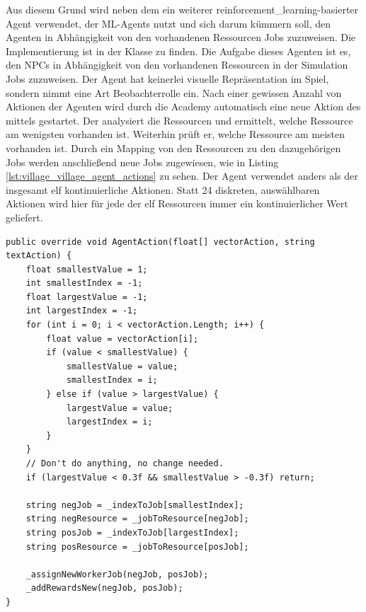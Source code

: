 Aus diesem Grund wird neben dem  ein weiterer \ac{reinforcement_learning}-basierter Agent verwendet, der ML-Agents nutzt und sich darum kümmern soll, den Agenten in Abhängigkeit von den vorhandenen Ressourcen Jobs zuzuweisen. Die Implementierung ist in der Klasse  zu finden. Die Aufgabe dieses Agenten ist es, den NPCs in Abhängigkeit von den vorhandenen Ressourcen in der Simulation Jobs zuzuweisen. Der Agent hat keinerlei visuelle Repräsentation im Spiel, sondern nimmt eine Art Beobachterrolle ein.
Nach einer gewissen Anzahl von Aktionen der Agenten wird durch die Academy automatisch eine neue Aktion des  mittels  gestartet. Der  analysiert die Ressourcen und ermittelt, welche Ressource am wenigsten vorhanden ist. Weiterhin prüft er, welche Ressource am meisten vorhanden ist. Durch ein Mapping von den Ressourcen zu den dazugehörigen Jobs werden anschließend neue Jobs zugewiesen, wie in Listing \ref{lst:village_village_agent_actions} zu sehen. Der Agent verwendet anders als der  insgesamt elf kontinuierliche Aktionen. Statt 24 diskreten, auswählbaren Aktionen wird hier für jede der elf Ressourcen immer ein kontinuierlicher Wert geliefert.

\begin{minipage}{\linewidth}
\begin{lstlisting}[linewidth=16.4cm, label=lst:village_village_agent_actions, caption=Aktionen des \inlinecode{VillageAgent}, xleftmargin=1cm]
public override void AgentAction(float[] vectorAction, string textAction) {
    float smallestValue = 1;
    int smallestIndex = -1;
    float largestValue = -1;
    int largestIndex = -1;
    for (int i = 0; i < vectorAction.Length; i++) {
        float value = vectorAction[i];
        if (value < smallestValue) {
            smallestValue = value;
            smallestIndex = i;
        } else if (value > largestValue) {
            largestValue = value;
            largestIndex = i;
        }
    }
    // Don't do anything, no change needed.
    if (largestValue < 0.3f && smallestValue > -0.3f) return; 

    string negJob = _indexToJob[smallestIndex];
    string negResource = _jobToResource[negJob];
    string posJob = _indexToJob[largestIndex];
    string posResource = _jobToResource[posJob];

    _assignNewWorkerJob(negJob, posJob);
    _addRewardsNew(negJob, posJob);
}
\end{lstlisting}
\end{minipage}

